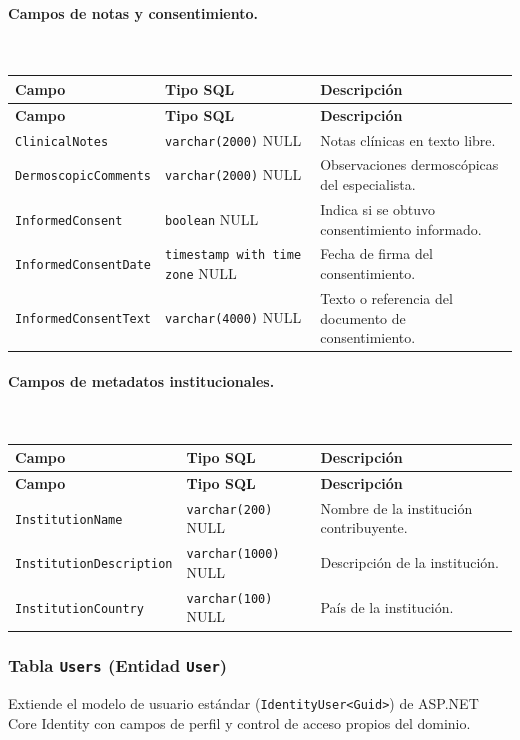 \paragraph{Campos de notas y consentimiento.}~

\begin{longtable}{|p{3.5cm}|p{4cm}|p{7cm}|}
\hline
\textbf{Campo} & \textbf{Tipo SQL} & \textbf{Descripción} \\
\hline
\endfirsthead
\hline
\textbf{Campo} & \textbf{Tipo SQL} & \textbf{Descripción} \\
\hline
\endhead
\texttt{ClinicalNotes} & \texttt{varchar(2000)} NULL & Notas clínicas en texto libre. \\
\hline
\texttt{Dermoscopic\-Comments} & \texttt{varchar(2000)} NULL & Observaciones dermoscópicas del especialista. \\
\hline
\texttt{InformedConsent} & \texttt{boolean} NULL & Indica si se obtuvo consentimiento informado. \\
\hline
\texttt{InformedConsent\-Date} & \texttt{timestamp with time zone} NULL & Fecha de firma del consentimiento. \\
\hline
\texttt{InformedConsent\-Text} & \texttt{varchar(4000)} NULL & Texto o referencia del documento de consentimiento. \\
\hline
\end{longtable}

\paragraph{Campos de metadatos institucionales.}~

\begin{longtable}{|p{3.5cm}|p{4cm}|p{7cm}|}
\hline
\textbf{Campo} & \textbf{Tipo SQL} & \textbf{Descripción} \\
\hline
\endfirsthead
\hline
\textbf{Campo} & \textbf{Tipo SQL} & \textbf{Descripción} \\
\hline
\endhead
\texttt{InstitutionName} & \texttt{varchar(200)} NULL & Nombre de la institución contribuyente. \\
\hline
\texttt{Institution\-Description} & \texttt{varchar(1000)} NULL & Descripción de la institución. \\
\hline
\texttt{Institution\-Country} & \texttt{varchar(100)} NULL & País de la institución. \\
\hline
\end{longtable}

\subsubsection{Tabla \texttt{Users} (Entidad \texttt{User})}
Extiende el modelo de usuario estándar (\texttt{IdentityUser<Guid>}) de ASP.NET Core Identity con campos de perfil y control de acceso propios del dominio.

